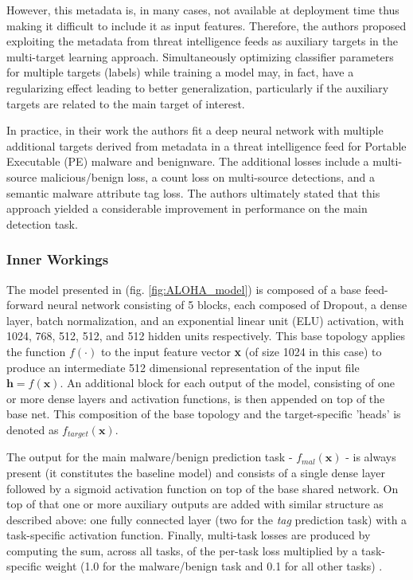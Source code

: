 \documentclass[pdfa%
,cucitura%
]{toptesi}
\begin{document}
However, this metadata is, in many cases, not available at deployment time thus making it difficult to include it as input features. Therefore, the authors proposed exploiting the metadata from threat intelligence feeds as auxiliary targets in the multi-target learning approach. Simultaneously optimizing classifier parameters for multiple targets (labels) while training a model may, in fact, have a regularizing effect leading to better generalization, particularly if the auxiliary targets are related to the main target of interest.

In practice, in their work \cite{ruddALOHA} the authors fit a deep neural network with multiple additional targets derived from metadata in a threat intelligence feed for Portable Executable (PE) malware and benignware. The additional losses include a multi-source malicious/benign loss, a count loss on multi-source detections, and a semantic malware attribute tag loss. The authors ultimately stated that this approach yielded a considerable improvement in performance on the main detection task.

\subsubsection{Inner Workings}
The model presented in \cite{ruddALOHA} (fig. \ref{fig:ALOHA_model}) is composed of a base feed-forward neural network consisting of 5 blocks, each composed of Dropout, a dense layer, batch normalization, and an exponential linear unit (ELU) activation, with 1024, 768, 512, 512, and 512 hidden units respectively. This base topology applies the function $f(\cdot)$ to the input feature vector \textbf{x} (of size 1024 in this case) to produce an intermediate 512 dimensional representation of the input file $\textbf{h} = f(\textbf{x})$. An additional block for each output of the model, consisting of one or more dense layers and activation functions, is then appended on top of the base net. This composition of the base topology and the target-specific 'heads' is denoted as $f_{target}(\textbf{x})$.

The output for the main malware/benign prediction task - $f_{mal}(\textbf{x})$ - is always present (it constitutes the baseline model) and consists of a single dense layer followed by a sigmoid activation function on top of the base shared network. On top of that one or more auxiliary outputs are added with similar structure as described above: one fully connected layer (two for the \textit{tag} prediction task) with a task-specific activation function. Finally, multi-task losses are produced by computing the sum, across all tasks, of the per-task loss multiplied by a task-specific weight (1.0 for the malware/benign task and 0.1 for all other tasks) \cite{ruddALOHA}.
\end{document}
